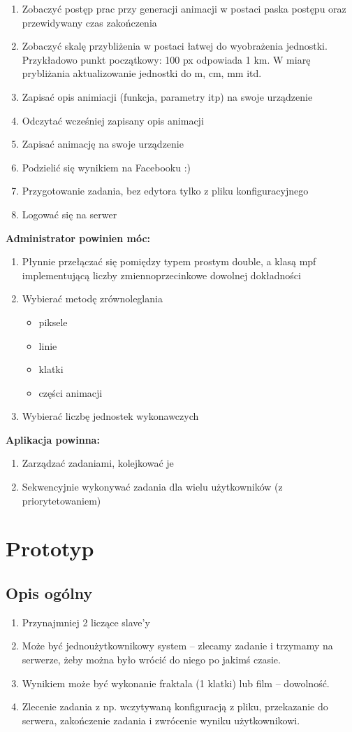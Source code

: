\documentclass[a4paper]{article}
\begin{document}
\begin{enumerate}
\item Zobaczyć postęp prac przy generacji animacji w postaci paska postępu oraz przewidywany czas zakończenia 
\item Zobaczyć skalę przybliżenia w postaci łatwej do wyobrażenia jednostki. Przykładowo punkt początkowy: 100 px odpowiada 1 km. W miarę prybliżania aktualizowanie jednostki do m, cm, mm itd.
\item Zapisać opis animiacji (funkcja, parametry itp) na swoje urządzenie
\item Odczytać wcześniej zapisany opis animacji
\item Zapisać animację na swoje urządzenie
\item Podzielić się wynikiem na Facebooku :)
\item Przygotowanie zadania, bez edytora tylko z pliku konfiguracyjnego
\item Logować się na serwer
\end{enumerate}
\textbf{Administrator powinien móc:}
\begin{enumerate}
\item Płynnie przełączać się pomiędzy typem prostym double, a klasą mpf implementującą liczby zmiennoprzecinkowe dowolnej dokładności
\item Wybierać metodę zrównoleglania 
\begin{itemize}
\item piksele
\item linie
\item klatki
\item części animacji
\end{itemize}
\item Wybierać liczbę jednostek wykonawczych
\end{enumerate}
\textbf{Aplikacja powinna:}
\begin{enumerate}
\item Zarządzać zadaniami, kolejkować je
\item Sekwencyjnie wykonywać zadania dla wielu użytkowników (z priorytetowaniem)
\end{enumerate}

\newpage

\section{Prototyp}
\subsection{Opis ogólny}
\begin{enumerate}
\item Przynajmniej 2 liczące slave'y
\item Może być jednoużytkownikowy system -- zlecamy zadanie i trzymamy na serwerze, żeby można było wrócić do niego po jakimś czasie.
\item Wynikiem może być wykonanie fraktala (1 klatki) lub film -- dowolność.
\item Zlecenie zadania z np. wczytywaną konfiguracją z pliku, przekazanie do serwera, zakończenie zadania i zwrócenie wyniku użytkownikowi.
\end{enumerate}
\end{document}
